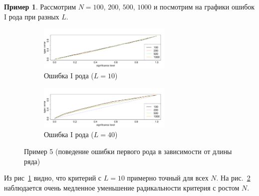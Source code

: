 \documentclass[specialist,
substylefile = spbu_report.rtx,
subf,href,colorlinks=true, 12pt]{disser}
\theoremstyle{definition}
\newtheorem{example}{Пример}
\begin{document}
\begin{example}
	Рассмотрим $N=100$, $200$, $500$, $1000$ и посмотрим на графики ошибок I рода при разных $L$.
	\begin{figure}[h!]
		\captionsetup[subfigure]{justification=Centering}
		\begin{subfigure}[t]{\textwidth}
			\centering
			\includegraphics[width=0.7\textwidth]{img/alphaI_L10.pdf}
			\caption{Ошибка I рода ($L=10$)}
			\label{alphaI_L10}
		\end{subfigure}
		\begin{subfigure}[t]{\textwidth}
			\centering
			\includegraphics[width=0.7\textwidth]{img/alphaI_L40.pdf}
			\caption{Ошибка I рода ($L=40$)}
			\label{alphaI_L40}
		\end{subfigure}
	\label{fig:example5}
	\caption{Пример 5 (поведение ошибки первого рода в зависимости от длины ряда)}
	\end{figure}
	Из рис~\ref{alphaI_L10} видно, что критерий с $L=10$ примерно точный для всех $N$. На рис.~\ref{alphaI_L40} наблюдается очень медленное уменьшение радикальности критерия с ростом $N$.

\end{example}
\end{document}
